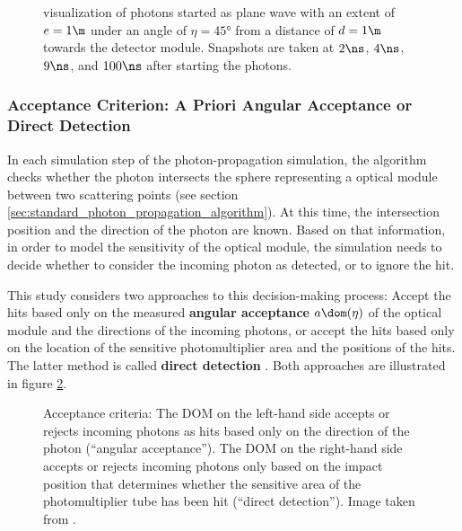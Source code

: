 \begin{figure}[htbp]
  \hfill
  \hfill
  \hfill
  \caption{\steamshovel visualization of photons started as plane wave with an extent of $e = 1\m$ under an angle of $\eta = \ang{45}$ from a distance of $d = 1\m$ towards the detector module. Snapshots are taken at $2\ns$, $4\ns$, $9\ns$, and $100\ns$ after starting the photons.}
  \label{fig:Aehi7kae}
\end{figure}


\FloatBarrier
\subsubsection{Acceptance Criterion: A Priori Angular Acceptance or Direct Detection}
\label{sec:acception_criterion}\label{sec:a_priori_angular_acceptance}
\label{sec:direct_detection}

In each simulation step of the photon-propagation simulation, the algorithm checks whether the photon intersects the sphere representing a optical module between two scattering points (see section \ref{sec:standard_photon_propagation_algorithm}). At this time, the intersection position and the direction of the photon are known. Based on that information, in order to model the sensitivity of the optical module, the simulation needs to decide whether to consider the incoming photon as detected, or to ignore the hit.

This study considers two approaches to this decision-making process: Accept the hits based only on the measured \textbf{angular acceptance} $a\dom(\eta)$ of the optical module and the directions of the incoming photons, or accept the hits based only on the location of the sensitive photomultiplier area and the positions of the hits. The latter method is called \textbf{direct detection} \cite{martinspicehddard}. Both approaches are illustrated in figure \ref{fig:kieQuoh1}.

\begin{figure}[htbp]
  \centering
  \caption{Acceptance criteria: The DOM on the left-hand side accepts or rejects incoming photons as hits based only on the direction of the photon (``angular acceptance''). The DOM on the right-hand side accepts or rejects incoming photons only based on the impact position that determines whether the sensitive area of the photomultiplier tube has been hit (``direct detection''). Image taken from \cite[slide 17]{martinspicehddard}.}
  \label{fig:kieQuoh1}
\end{figure}

